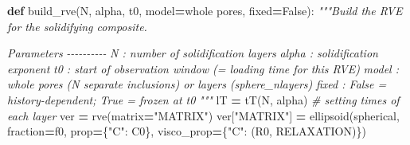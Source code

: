 \documentclass[
  a4paper,
  numbers=noendperiod,
  DIV=12]{scrreprt}
\newenvironment{Shaded}{\begin{snugshade}}{\end{snugshade}}
\newcommand{\CommentTok}[1]{\textcolor[rgb]{0.56,0.35,0.01}{\textit{#1}}}
\newcommand{\KeywordTok}[1]{\textcolor[rgb]{0.13,0.29,0.53}{\textbf{#1}}}
\newcommand{\NormalTok}[1]{#1}
\newcommand{\OperatorTok}[1]{\textcolor[rgb]{0.81,0.36,0.00}{\textbf{#1}}}
\newcommand{\StringTok}[1]{\textcolor[rgb]{0.31,0.60,0.02}{#1}}
\newcommand{\VariableTok}[1]{\textcolor[rgb]{0.00,0.00,0.00}{#1}}
\begin{document}
\begin{Shaded}
\begin{Highlighting}[]
\KeywordTok{def}\NormalTok{ build\_rve(N, alpha, t0, model}\OperatorTok{=}\StringTok{\textquotesingle{}whole pores\textquotesingle{}}\NormalTok{, fixed}\OperatorTok{=}\VariableTok{False}\NormalTok{):}
    \CommentTok{"""Build the RVE for the solidifying composite.}

\CommentTok{    Parameters}
\CommentTok{    {-}{-}{-}{-}{-}{-}{-}{-}{-}{-}}
\CommentTok{    N     : number of solidification layers}
\CommentTok{    alpha : solidification exponent}
\CommentTok{    t0    : start of observation window (= loading time for this RVE)}
\CommentTok{    model : \textquotesingle{}whole pores\textquotesingle{} (N separate inclusions) or \textquotesingle{}layers\textquotesingle{} (sphere\_nlayers)}
\CommentTok{    fixed : False = history{-}dependent; True = frozen at t0}
\CommentTok{    """}
\NormalTok{    lT  }\OperatorTok{=}\NormalTok{ tT(N, alpha)       }\CommentTok{\# setting times of each layer}
\NormalTok{    ver }\OperatorTok{=}\NormalTok{ rve(matrix}\OperatorTok{=}\StringTok{"MATRIX"}\NormalTok{)}
\NormalTok{    ver[}\StringTok{"MATRIX"}\NormalTok{] }\OperatorTok{=}\NormalTok{ ellipsoid(spherical, fraction}\OperatorTok{=}\NormalTok{f0,}
\NormalTok{                               prop}\OperatorTok{=}\NormalTok{\{}\StringTok{"C"}\NormalTok{: C0\},}
\NormalTok{                               visco\_prop}\OperatorTok{=}\NormalTok{\{}\StringTok{"C"}\NormalTok{: (R0, RELAXATION)\})}


\end{Highlighting}
\end{Shaded}
\end{document}
